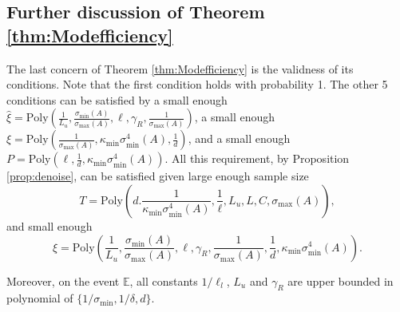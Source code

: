 \documentclass[twoside]{article}
\newcommand{\E}{\mathbb{E}}
\theoremstyle{definition}
\begin{document}
\subsection{Further discussion of Theorem \ref{thm:Modefficiency}}
 \label{subsec:ThminStocSetting}
The last concern of Theorem \ref{thm:Modefficiency} is the validness of its conditions. 
Note that the first condition holds with probability 1. 
The other 5 conditions can be satisfied by a small enough 
$\widehat{\xi} = \text{Poly}(\frac{1}{L_u}, \frac{\sigma_{\min}(A)}{\sigma_{\max}(A)}, \ell, \gamma_R, \frac{1}{\sigma_{\max}(A)})$,
a small enough $\xi = \text{Poly}(\frac{1}{\sigma_{\max}(A)}, \kappa_{\min}\sigma_{\min}^4(A),\frac{1}{d})$,
and a small enough $P = \text{Poly}(\ell, \frac{1}{d}, \kappa_{\min}\sigma_{\min}^4(A))$.
All this requirement, by Proposition \ref{prop:denoise}, can be satisfied given large enough sample size 
\[T = \text{Poly}(d.\frac{1}{\kappa_{\min}\sigma^4_{\min}(A)}, \frac{1}{\ell}, L_u, L, C, \sigma_{\max}(A)),\] 
and small enough 
\[\xi = \text{Poly}(\frac{1}{L_u}, \frac{\sigma_{\min}(A)}{\sigma_{\max}(A)}, \ell, \gamma_R, \frac{1}{\sigma_{\max}(A)},\frac{1}{d}, \kappa_{\min}\sigma_{\min}^4(A)).\] 

Moreover, on the event $\E$, all constants $1/\ell_l$, $L_u$ and $\gamma_R$ are upper bounded in polynomial of $\{ 1/\sigma_{\min}, 1/\delta, d\}$. 
\end{document}

